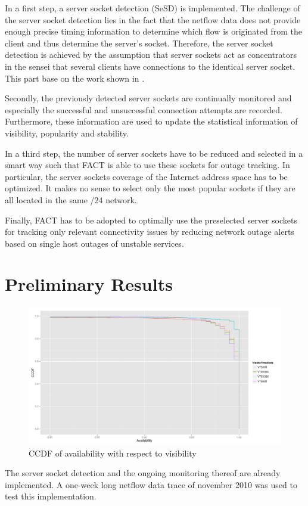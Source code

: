 \documentclass{sigcomm-alternate}
\begin{document}
In a first step, a server socket detection (SeSD) is implemented. The
challenge of the server socket detection lies in the fact that the
netflow data does not provide enough precise timing information to
determine which flow is originated from the client and thus determine
the server's socket. Therefore, the server socket detection is
achieved by the assumption that server sockets act as concentrators
in the sensei that several clients have connections to the identical
server socket. This part base on the work shown in \cite{TechReport}.

Secondly, the previously detected server sockets are continually
monitored and especially the successful and unsuccessful connection
attempts are recorded. Furthermore, these information are used to update
the statistical information of visibility, popularity and stability.

In a third step, the number of server sockets have to be reduced and
selected in a smart way such that FACT is able to use these sockets
for outage tracking. In particular, the server sockets coverage of the
Internet address space has to be optimized. It makes no sense to select
only the most popular sockets if they are all located in the same /24
network.

Finally, FACT has to be adopted to optimally use the preselected server
sockets for tracking only relevant connectivity issues by reducing
network outage alerts based on single host outages of unstable services.


\section{Preliminary Results} 

\begin{figure}[ht!]
\centering \includegraphics[width=18cm]{images/RATIO_VTS_External.pdf}
\caption{CCDF of availability with respect to visibility}
\label{fig:RatioVTS} \end{figure} The server socket detection and
the ongoing monitoring thereof are already implemented. A one-week
long netflow data trace of november 2010 was used to test this
implementation.
\end{document}
